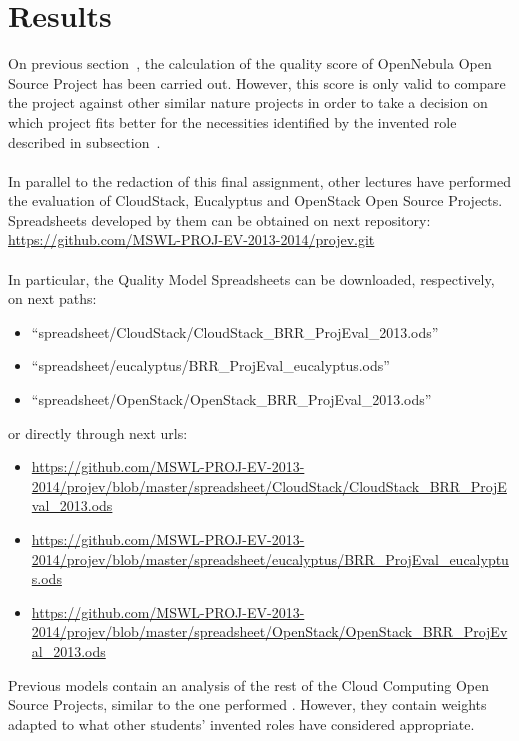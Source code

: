 \documentclass[11pt]{article}
\begin{document}
\section{Results} \label{sec:results}
On previous section~, the calculation of the quality score of OpenNebula Open Source Project has been carried out. However, this score is only valid to compare the project against other similar nature projects in order to take a decision on which project fits better for the necessities identified by the invented role described in subsection~.\\
\\
In parallel to the redaction of this final assignment, other lectures have performed the evaluation of CloudStack, Eucalyptus and OpenStack Open Source Projects. Spreadsheets developed by them can be obtained on next repository:
\\
\url{https://github.com/MSWL-PROJ-EV-2013-2014/projev.git}\\
\\
In particular, the Quality Model Spreadsheets can be downloaded, respectively, on next paths:
\begin{itemize}\itemsep0pt
\item{``spreadsheet/CloudStack/CloudStack\_BRR\_ProjEval\_2013.ods''}
\item{``spreadsheet/eucalyptus/BRR\_ProjEval\_eucalyptus.ods''}
\item{``spreadsheet/OpenStack/OpenStack\_BRR\_ProjEval\_2013.ods''}
\end{itemize}
or directly through next urls:
\begin{itemize}\itemsep0pt
\item{\url{https://github.com/MSWL-PROJ-EV-2013-2014/projev/blob/master/spreadsheet/CloudStack/CloudStack\_BRR\_ProjEval\_2013.ods}}
\item{\url{https://github.com/MSWL-PROJ-EV-2013-2014/projev/blob/master/spreadsheet/eucalyptus/BRR\_ProjEval\_eucalyptus.ods}}
\item{\url{https://github.com/MSWL-PROJ-EV-2013-2014/projev/blob/master/spreadsheet/OpenStack/OpenStack\_BRR\_ProjEval\_2013.ods}}
\end{itemize}
Previous models contain an analysis of the rest of the Cloud Computing Open Source Projects, similar to the one performed . However, they contain weights adapted to what other students' invented roles have considered appropriate.\\
\\
\end{document}
